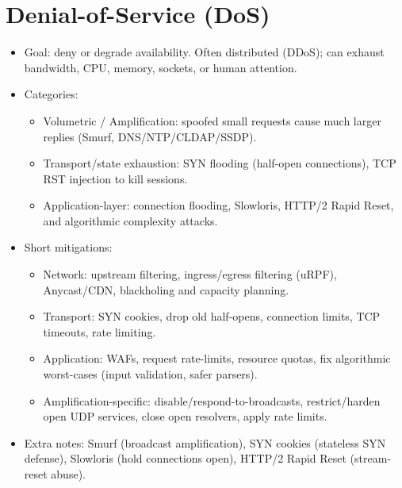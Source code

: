 \documentclass[12pt]{article}
\begin{document}
\hrulefill

\section{Denial-of-Service (DoS)}
\begin{itemize}
  \item Goal: deny or degrade availability. Often distributed (DDoS); can exhaust bandwidth, CPU, memory, sockets, or human attention.
  \item Categories:
    \begin{itemize}
      \item Volumetric / Amplification: spoofed small requests cause much larger replies (Smurf, DNS/NTP/CLDAP/SSDP).
      \item Transport/state exhaustion: SYN flooding (half-open connections), TCP RST injection to kill sessions.
      \item Application-layer: connection flooding, Slowloris, HTTP/2 Rapid Reset, and algorithmic complexity attacks.
    \end{itemize}
  \item Short mitigations:
    \begin{itemize}
      \item Network: upstream filtering, ingress/egress filtering (uRPF), Anycast/CDN, blackholing and capacity planning.
      \item Transport: SYN cookies, drop old half-opens, connection limits, TCP timeouts, rate limiting.
      \item Application: WAFs, request rate-limits, resource quotas, fix algorithmic worst-cases (input validation, safer parsers).
      \item Amplification-specific: disable/respond-to-broadcasts, restrict/harden open UDP services, close open resolvers, apply rate limits.
    \end{itemize}
  \item Extra notes: Smurf (broadcast amplification), SYN cookies (stateless SYN defense), Slowloris (hold connections open), HTTP/2 Rapid Reset (stream-reset abuse).
\end{itemize}
\end{document}

